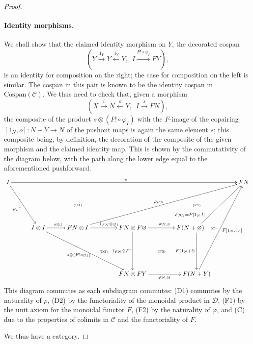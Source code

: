 \begin{proof}
\paragraph{Identity morphisms.} 
We shall show that the claimed identity morphism on $Y$, the decorated cospan
\[
  (Y \stackrel{1_Y}\longrightarrow Y \stackrel{1_Y}\longleftarrow Y,\enspace I
\xrightarrow{F!\circ \varphi_I} FY),
\]
is an identity for composition
on the right; the case for composition on the left is similar. The cospan in
this pair is known to be the identity cospan in $\mathrm{Cospan}(\mathcal C)$.
We thus need to check that, given a morphism 
\[
  (X \stackrel{i}\longrightarrow N
\stackrel{o}\longleftarrow Y,\enspace I \stackrel{s}\longrightarrow FN),
\] 
the composite of the product $s \otimes (F! \circ \varphi_I)$ with the $F$-image
of the copairing \linebreak $[1_N,o]\colon  N+Y \to N$ of the pushout maps is
again the same element $s$; this composite being, by definition, the decoration
of the composite of the given morphism and the claimed identity map. This is
shown by the commutativity of the diagram below, with the path along the lower
edge equal to the aforementioned pushforward.
\[
  \xymatrixcolsep{.96pc}
  \xymatrix{
    I \ar[rrrrrrrrrr]^s \ar[ddrr]_{\rho_I^{-1}} &&&&&&&&&& FN \\
    &&&& \textrm{\tiny(D1)} &&&& \textrm{\tiny(F1)}\\
    && I \otimes I \ar[rr]^{s\otimes 1} \ar[ddrrrr]_{s \otimes (F! \circ
    \varphi_I)} && FN \otimes I \ar[uurrrrrr]^{\rho_{FN}} \ar[rr]^(.57){1_{FN}
  \otimes \varphi_I}
    && FN \otimes F\varnothing \ar[rr]^{\varphi_{N,\varnothing}} \ar[dd]_{1_{FN}
  \otimes F!} && F(N+\varnothing) \ar[uurr]^(.2){F\rho_N=F[1_N,!]}
      \ar[dd]_{F(1_N+!)} \quad \textrm{\tiny(C)}\\
      &&&&& \textrm{\tiny(D2)} && \textrm{\tiny(F2)}\\
      &&&&&& FN \otimes FY \ar[rr]_{\varphi_{N,M}} && F(N+Y)
      \ar[uuuurr]_{F[1_N,i_Y]}
  }
\]
This diagram commutes as each subdiagram commutes: (D1) commutes by the
naturality of $\rho$, (D2) by the functoriality of the monoidal product in
$\mathcal D$, (F1) by the unit axiom for the monoidal functor $F$, (F2) by the
naturality of $\varphi$, and (C) due to the properties of colimits in $\mathcal
C$ and the functoriality of $F$.

We thus have a category.
\end{proof}

